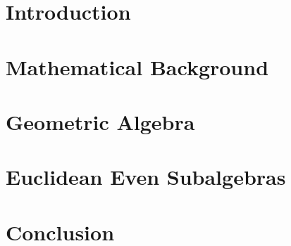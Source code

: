 \documentclass[12pt]{report}
\theoremstyle{definition}
\theoremstyle{definition}
\theoremstyle{remark}
\begin{document}





\tableofcontents
\listoftables

\chapter{Introduction}


\chapter{Mathematical Background}


\chapter{Geometric Algebra}\label{ch:ga}


\chapter{Euclidean Even Subalgebras}\label{ch:euclidean-even}


\chapter{Conclusion}


\printbibliography
\end{document}
